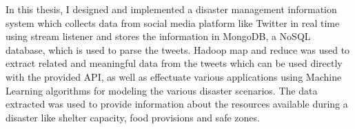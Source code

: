 % 
% 
%
In this thesis, I designed and implemented a disaster management information system which collects data from social media platform like Twitter in real time using stream listener and stores the information in MongoDB, a NoSQL database, which is used to parse the tweets. Hadoop map and reduce was used to extract related and meaningful data from the tweets which can be used directly with the provided API, as well as effectuate various applications using Machine Learning algorithms for modeling the various disaster scenarios. The data extracted was used to provide information about the resources available during a disaster like shelter capacity, food provisions and safe zones.